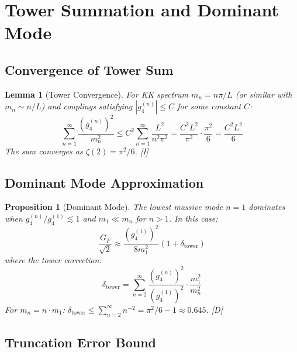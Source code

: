 \documentclass[11pt,a4paper]{article}
\newtheorem{lemma}[theorem]{Lemma}
\newtheorem{proposition}[theorem]{Proposition}
\begin{document}
\section{Tower Summation and Dominant Mode}
\label{sec:tower}

\subsection{Convergence of Tower Sum}

\begin{lemma}[Tower Convergence]
\label{lem:convergence}
For KK spectrum $m_n = n\pi/L$ (or similar with $m_n \sim n/L$) and
couplings satisfying $|g_4^{(n)}| \leq C$ for some constant $C$:
\begin{equation}
\sum_{n=1}^{\infty} \frac{(g_4^{(n)})^2}{m_n^2} \leq C^2 \sum_{n=1}^{\infty} \frac{L^2}{n^2\pi^2}
= \frac{C^2 L^2}{\pi^2} \cdot \frac{\pi^2}{6} = \frac{C^2 L^2}{6}
\label{eq:convergence-bound}
\end{equation}
The sum converges as $\zeta(2) = \pi^2/6$. [I]
\end{lemma}

\subsection{Dominant Mode Approximation}

\begin{proposition}[Dominant Mode]
\label{prop:dominant}
The lowest massive mode $n = 1$ dominates when $g_4^{(n)}/g_4^{(1)} \lesssim 1$ and
$m_1 \ll m_n$ for $n > 1$. In this case:
\begin{equation}
\frac{G_F}{\sqrt{2}} \approx \frac{(g_4^{(1)})^2}{8m_1^2}\left(1 + \delta_{\text{tower}}\right)
\label{eq:dominant-approx}
\end{equation}
where the tower correction:
\begin{equation}
\delta_{\text{tower}} = \sum_{n=2}^{\infty} \frac{(g_4^{(n)})^2}{(g_4^{(1)})^2} \cdot \frac{m_1^2}{m_n^2}
\label{eq:tower-correction}
\end{equation}
For $m_n = n \cdot m_1$: $\delta_{\text{tower}} \leq \sum_{n=2}^{\infty} n^{-2} = \pi^2/6 - 1 \approx 0.645$. [D]
\end{proposition}

\subsection{Truncation Error Bound}
\end{document}

